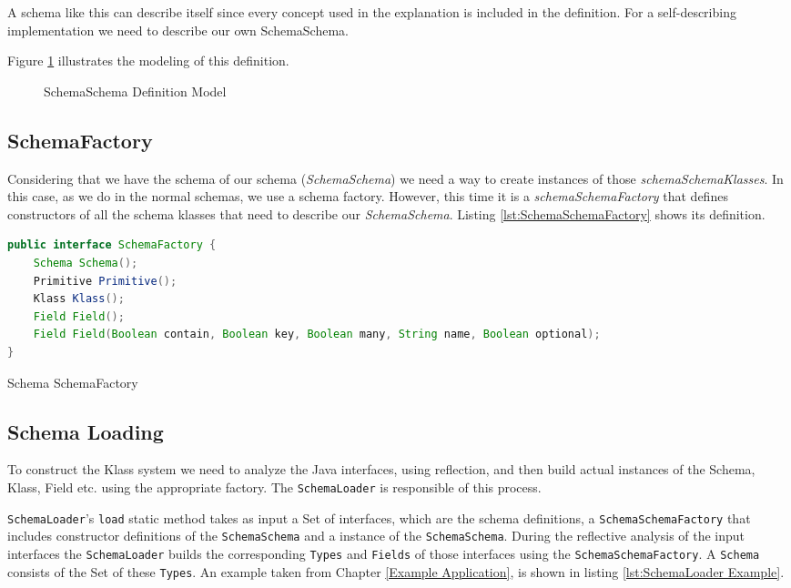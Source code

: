 A schema like this can describe itself since every concept used in the explanation is included in the definition.
For a self-describing implementation we need to describe our own SchemaSchema. 

Figure \ref{fig:SchemaSchema_definition} illustrates the modeling of this definition.

\begin{figure}[H]
	\centering
  	\caption{SchemaSchema Definition Model}
  	\label{fig:SchemaSchema_definition}
\end{figure}

\subsection{SchemaFactory}\label{sec:SchemaFactory}
Considering that we have the schema of our schema (\textit{SchemaSchema}) we need a way to create instances of those \textit{schemaSchemaKlasses}.
In this case, as we do in the normal schemas, we use a schema factory. 
However, this time it is a \textit{schemaSchemaFactory} that defines constructors of all the schema klasses that need to describe our \textit{SchemaSchema}.
Listing \ref{lst:SchemaSchemaFactory} shows its definition.

\begin{sourcecode} [H]
	\begin{lstlisting}[language=Java, escapechar=|]
public interface SchemaFactory {
    Schema Schema();
    Primitive Primitive();
    Klass Klass();
    Field Field();
    Field Field(Boolean contain, Boolean key, Boolean many, String name, Boolean optional);
}
	\end{lstlisting}
	\caption{Schema SchemaFactory}
	\label{lst:SchemaSchemaFactory}
\end{sourcecode}

\subsection{Schema Loading}\label{sec:Schema Loading}
To construct the Klass system we need to analyze the Java interfaces, using reflection, and then build actual instances of the Schema, Klass, Field etc. using the appropriate factory.
The \texttt{SchemaLoader} is responsible of this process.

\texttt{SchemaLoader}'s \texttt{load} static method takes as input a Set of interfaces, which are the schema definitions, a \texttt{SchemaSchemaFactory} that includes constructor definitions of the \texttt{SchemaSchema} and a instance of the \texttt{SchemaSchema}.
During the reflective analysis of the input interfaces the \texttt{SchemaLoader} builds the corresponding \texttt{Types} and \texttt{Fields} of those interfaces using the \texttt{SchemaSchemaFactory}.
A \texttt{Schema} consists of the Set of these \texttt{Types}.
An example taken from Chapter \ref{Example Application}, is shown in listing \ref{lst:SchemaLoader Example}.

